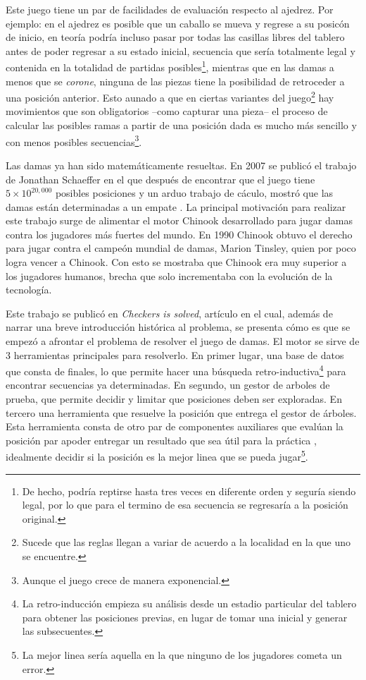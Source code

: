 \documentclass[twoside,openright,12pt,a4paper,spanish]{book}
\begin{document}
Este juego tiene un par de facilidades de evaluaci\'on respecto al ajedrez. Por ejemplo: en el ajedrez es posible que un caballo se mueva y regrese a su posic\'on de inicio, en teor\'ia podr\'ia incluso pasar por todas las casillas libres del tablero antes de poder regresar a su estado inicial, secuencia que ser\'ia totalmente legal y contenida en la totalidad de partidas posibles\footnote{De hecho, podr\'ia reptirse hasta tres veces en diferente orden y segur\'ia siendo legal, por lo que para el termino de esa secuencia se regresar\'ia a la posici\'on original.}, mientras que en las damas a menos que se \emph{corone}, ninguna de las piezas tiene la posibilidad de retroceder a una posici\'on anterior. Esto aunado a que en ciertas variantes del juego\footnote{Sucede que las reglas llegan a variar de acuerdo a la localidad en la que uno se encuentre.} hay movimientos que son obligatorios --como capturar una pieza-- el proceso de calcular las posibles ramas a partir de una posici\'on dada es mucho m\'as sencillo y con menos posibles secuencias\footnote{Aunque el juego crece de manera exponencial.}.

Las damas ya han sido matem\'aticamente resueltas. En 2007 se public\'o el trabajo de Jonathan Schaeffer \cite{schaeffer2007checkers} en el que despu\'es de encontrar que el juego tiene $5\times10^{20,000}$ posibles posiciones y un arduo trabajo de c\'aculo, mostr\'o que las damas est\'an determinadas a un empate \cite[p. 1518]{schaeffer2007checkers}. La principal motivaci\'on para realizar este trabajo surge de alimentar el motor Chinook desarrollado para jugar damas contra los jugadores m\'as fuertes del mundo. En 1990 Chinook obtuvo el derecho para jugar contra el campe\'on mundial de damas, Marion Tinsley, quien por poco logra vencer a Chinook. Con esto se mostraba que Chinook era muy superior a los jugadores humanos, brecha que solo incrementaba con la evoluci\'on de la tecnolog\'ia.

Este trabajo se public\'o en \emph{Checkers is solved}, art\'iculo en el cual, adem\'as de narrar una breve introducci\'on hist\'orica al problema, se presenta c\'omo es que se empez\'o a afrontar el problema de resolver el juego de damas. El motor se sirve de 3 herramientas principales para resolverlo. En primer lugar, una base de datos que consta de finales, lo que permite hacer una búsqueda retro-inductiva\footnote{La retro-inducci\'on empieza su an\'alisis desde un estadio particular del tablero para obtener las posiciones previas, en lugar de tomar una inicial y generar las subsecuentes.} para encontrar secuencias ya determinadas. En segundo, un gestor de arboles de prueba, que permite decidir y limitar que posiciones deben ser exploradas. En tercero una herramienta que resuelve la posici\'on que entrega el gestor de \'arboles. Esta herramienta consta de otro par de componentes auxiliares que eval\'uan la posici\'on par apoder entregar un resultado que sea \'util para la pr\'actica \cite[p. 1519]{schaeffer2007checkers}, idealmente decidir si la posici\'on es la mejor linea que se pueda jugar\footnote{La mejor linea ser\'ia aquella en la que ninguno de los jugadores cometa un error.}.
\end{document}
